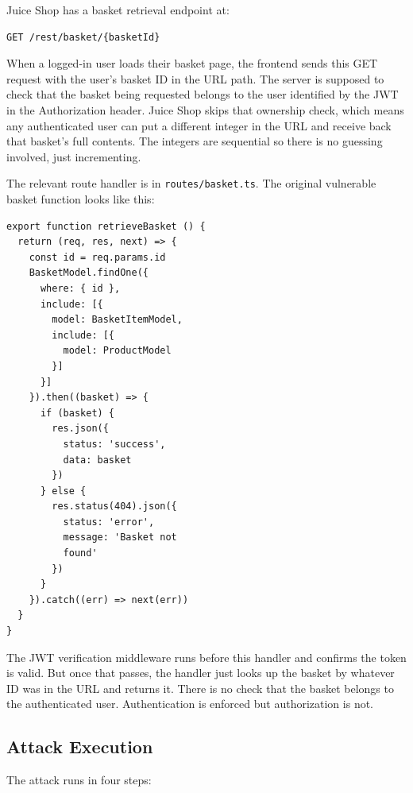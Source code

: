 \documentclass[12pt]{IEEEtran}
\begin{document}
Juice Shop has a basket retrieval endpoint at:

\begin{verbatim}
GET /rest/basket/{basketId}
\end{verbatim}

When a logged-in user loads their basket page, the frontend sends this GET request with the user's basket ID in the URL path. The server is supposed to check that the basket being requested belongs to the user identified by the JWT in the Authorization header. Juice Shop skips that ownership check, which means any authenticated user can put a different integer in the URL and receive back that basket's full contents. The integers are sequential so there is no guessing involved, just incrementing.

The relevant route handler is in \texttt{routes/basket.ts}. The original vulnerable basket function looks like this:

\begin{verbatim}
export function retrieveBasket () {
  return (req, res, next) => {
    const id = req.params.id
    BasketModel.findOne({
      where: { id },
      include: [{
        model: BasketItemModel,
        include: [{
          model: ProductModel
        }]
      }]
    }).then((basket) => {
      if (basket) {
        res.json({
          status: 'success',
          data: basket
        })
      } else {
        res.status(404).json({
          status: 'error',
          message: 'Basket not 
          found'
        })
      }
    }).catch((err) => next(err))
  }
}
\end{verbatim}

The JWT verification middleware runs before this handler and confirms the token is valid. But once that passes, the handler just looks up the basket by whatever ID was in the URL and returns it. There is no check that the basket belongs to the authenticated user. Authentication is enforced but authorization is not.

\subsection{Attack Execution}

The attack runs in four steps:
\end{document}
